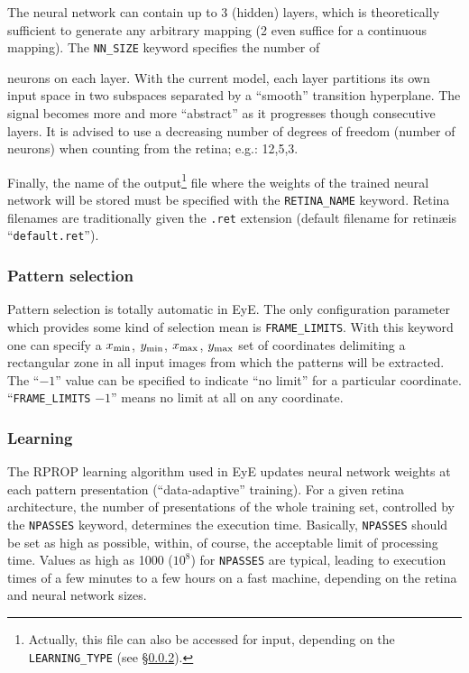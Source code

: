 \documentclass[11pt,titlepage]{article}
\begin{document}
The neural network can contain up to 3 (hidden) layers, which is theoretically sufficient to generate
any arbitrary mapping (2 even suffice for a continuous mapping). The {\tt NN\_SIZE} keyword specifies the number of

neurons on each layer. With the current model, each layer partitions its own input space in two subspaces separated by
a ``smooth'' transition hyperplane. The signal becomes more and more ``abstract'' as it progresses though consecutive
layers. It is advised to use a decreasing number of degrees of freedom (number of neurons) when counting from the
retina; e.g.: 12,5,3.

Finally, the name of the output\footnote{Actually, this file can also be accessed for input, depending on the
{\tt LEARNING\_TYPE} (see \S \ref{chap:learn}).}
file where the weights of the trained neural network will be stored must be
specified with the {\tt RETINA\_NAME} keyword. Retina filenames are traditionally given the {\tt .ret} extension
(default filename for retin\ae is ``{\tt default.ret}'').

\subsubsection{Pattern selection}
Pattern selection is totally automatic in {\sc EyE}. The only configuration 
parameter which provides some kind of
selection mean is {\tt FRAME\_LIMITS}. With this keyword one can specify a $x_
{\rm min}$, $y_{\rm min}$,
$x_{\rm max}$, $y_{\rm max}$ set of coordinates delimiting a rectangular zone in 
all input images from which
the patterns will be extracted. The ``$-1$'' value can be specified to indicate 
``no limit'' for a particular coordinate.
``{\tt FRAME\_LIMITS} $-1$'' means no limit at all on any coordinate.

\subsubsection{Learning}
\label{chap:learn}
The RPROP learning algorithm used in {\sc EyE} updates neural network weights at 
each pattern presentation
(``data-adaptive'' training). For a given retina architecture, the number of 
presentations of the whole training set, controlled by the
{\tt NPASSES} keyword, determines the execution time. Basically, {\tt NPASSES} 
should be set as high as possible,
within, of course, the acceptable limit of processing time. Values as high as 
1000 ($10^8$) for {\tt NPASSES}
are typical, leading to execution times of a few minutes to a few hours on a 
fast machine, depending on the retina and neural network sizes.
\end{document}
